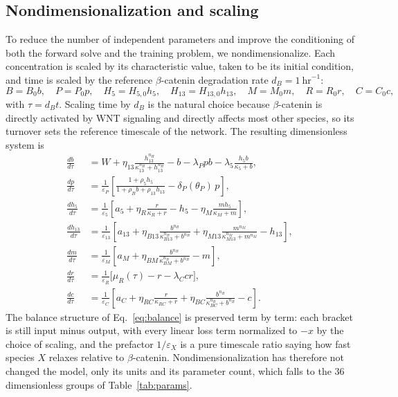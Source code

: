 \documentclass[11pt]{article}
\newcommand{\bcat}{$\beta$-\hspace{0pt}catenin}
\newcommand{\thP}{\theta_P}
\begin{document}
\subsection{Nondimensionalization and scaling}

To reduce the number of independent parameters and improve the conditioning of
both the forward solve and the training problem, we nondimensionalize. Each
concentration is scaled by its characteristic value, taken to be its initial
condition, and time is scaled by the reference \bcat{} degradation rate
$d_B = 1\ \mathrm{hr}^{-1}$:
\begin{equation}
B = B_0b,\quad P = P_0p,\quad H_5 = H_{5,0}h_5,\quad
H_{13} = H_{13,0}h_{13},\quad M = M_0m,\quad R = R_0r,\quad C = C_0c,
\end{equation}
with $\tau = d_B t$. Scaling time by $d_B$ is the natural choice because
\bcat{} is directly activated by WNT signaling and directly affects most other
species, so its turnover sets the reference timescale of the network. The
resulting dimensionless system is
\begin{align}
\frac{db}{d\tau}
&= W + \eta_{13}\frac{h_{13}^{n_H}}{\kappa_{13}^{n_H}+h_{13}^{n_H}}
- b - \lambda_Ppb - \lambda_5\frac{h_5b}{\kappa_5+b},
\label{eq:ndb}\\[6pt]
\frac{dp}{d\tau}
&= \frac{1}{\varepsilon_P}\left[
\frac{1+\rho_5h_5}{1+\rho_Bb+\rho_{13}h_{13}} - \delta_P(\thP)\,p\right],
\label{eq:ndp}\\[6pt]
\frac{dh_5}{d\tau}
&= \frac{1}{\varepsilon_5}\left[
a_5 + \eta_R\frac{r}{\kappa_R+r} - h_5 - \eta_M\frac{mh_5}{\kappa_M+m}\right],
\label{eq:ndh5}\\[6pt]
\frac{dh_{13}}{d\tau}
&= \frac{1}{\varepsilon_{13}}\left[
a_{13} + \eta_{B13}\frac{b^{n_B}}{\kappa_{B13}^{n_B}+b^{n_B}}
+ \eta_{M13}\frac{m^{n_M}}{\kappa_{M13}^{n_M}+m^{n_M}} - h_{13}\right],
\label{eq:ndh13}\\[6pt]
\frac{dm}{d\tau}
&= \frac{1}{\varepsilon_M}\left[
a_M + \eta_{BM}\frac{b^{n_B}}{\kappa_{BM}^{n_B}+b^{n_B}} - m\right],
\label{eq:ndm}\\[6pt]
\frac{dr}{d\tau}
&= \frac{1}{\varepsilon_R}\Big[\mu_R(\tau) - r - \lambda_Ccr\Big],
\label{eq:ndr}\\[6pt]
\frac{dc}{d\tau}
&= \frac{1}{\varepsilon_C}\left[
a_C + \eta_{RC}\frac{r}{\kappa_{RC}+r}
+ \eta_{BC}\frac{b^{n_B}}{\kappa_{BC}^{n_B}+b^{n_B}} - c\right].
\label{eq:ndc}
\end{align}
The balance structure of Eq.~\eqref{eq:balance} is preserved term by term:
each bracket is still input minus output, with every linear loss term
normalized to $-x$ by the choice of scaling, and the prefactor
$1/\varepsilon_X$ is a pure timescale ratio saying how fast species $X$ relaxes
relative to \bcat{}. Nondimensionalization has therefore not changed the model,
only its units and its parameter count, which falls to the 36 dimensionless
groups of Table~\ref{tab:params}.
\end{document}
